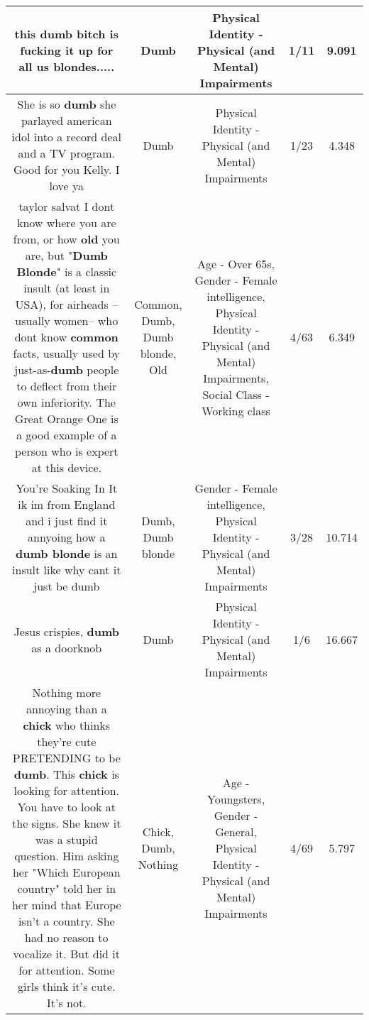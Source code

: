 \documentclass[11pt]{article}
\newlength\mylength
\begin{document}
\begin{center}
\begin{longtable}{|C{.65\mylength}|C{.30\mylength}|C{.12\mylength}|C{.12\mylength}|C{.12\mylength}|}
  \small this \textbf{dumb} bitch is fucking it up for all us blondes.....\normalsize   & Dumb & Physical Identity - Physical (and Mental) Impairments & 1/11 & 9.091 \\  \hline
  \small She is so \textbf{dumb} she parlayed american idol into a record deal and a TV program. Good for you Kelly. I love ya\normalsize   & Dumb & Physical Identity - Physical (and Mental) Impairments & 1/23 & 4.348 \\  \hline
  \small taylor salvat I dont know where you are from, or how \textbf{old} you are, but "\textbf{D\textbf{umb} Blonde}" is a classic insult (at least in USA), for airheads -- usually women-- who dont know \textbf{common} facts, usually used by just-as-\textbf{dumb} people to deflect from their own inferiority.  The Great Orange One is a good example of a person who is expert at this device.\normalsize   & Common, Dumb, Dumb blonde, Old & Age - Over 65s, Gender - Female intelligence, Physical Identity - Physical (and Mental) Impairments, Social Class - Working class & 4/63 & 6.349 \\  \hline
  \small You're Soaking In It ik im from England and i just find it annyoing how a \textbf{d\textbf{umb} blonde} is an insult like why cant it just be dumb\normalsize   & Dumb, Dumb blonde & Gender - Female intelligence, Physical Identity - Physical (and Mental) Impairments & 3/28 & 10.714 \\  \hline
  \small Jesus crispies, \textbf{dumb} as a doorknob\normalsize   & Dumb & Physical Identity - Physical (and Mental) Impairments & 1/6 & 16.667 \\  \hline
  \small Nothing more annoying than a \textbf{chick} who thinks they're cute PRETENDING to be \textbf{dumb}. This \textbf{chick} is looking for attention. You have to look at the signs. She knew it was a stupid question. Him asking her "Which European country" told her in her mind that Europe isn't a country. She had no reason to vocalize it. But did it for attention. Some girls think it's cute. It's not.\normalsize   & Chick, Dumb, Nothing & Age - Youngsters, Gender - General, Physical Identity - Physical (and Mental) Impairments & 4/69 & 5.797 \\  \hline

\end{longtable}
\end{center}
\end{document}
